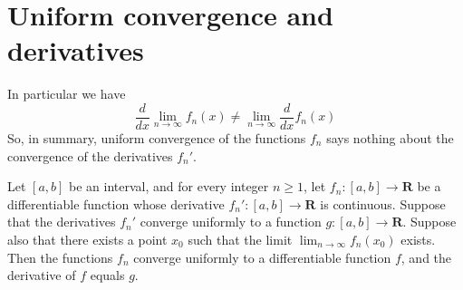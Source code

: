\section{Uniform convergence and derivatives}\label{sec 3.7}

\begin{note}
    In particular we have
    \[
        \frac{d}{dx} \lim_{n \to \infty} f_n(x) \neq \lim_{n \to \infty} \frac{d}{dx} f_n(x)
    \]
    So, in summary, uniform convergence of the functions \(f_n\) says nothing about the convergence of the derivatives \(f_n'\).
\end{note}

\begin{theorem}\label{3.7.1}
    Let \([a, b]\) be an interval, and for every integer \(n \geq 1\), let \(f_n : [a, b] \to \mathbf{R}\) be a differentiable function whose derivative \(f_n' : [a, b] \to \mathbf{R}\) is continuous.
    Suppose that the derivatives \(f_n'\) converge uniformly to a function \(g : [a, b] \to \mathbf{R}\).
    Suppose also that there exists a point \(x_0\) such that the limit \(\lim_{n \to \infty} f_n(x_0)\) exists.
    Then the functions \(f_n\) converge uniformly to a differentiable function \(f\), and the derivative of \(f\) equals \(g\).
\end{theorem}

